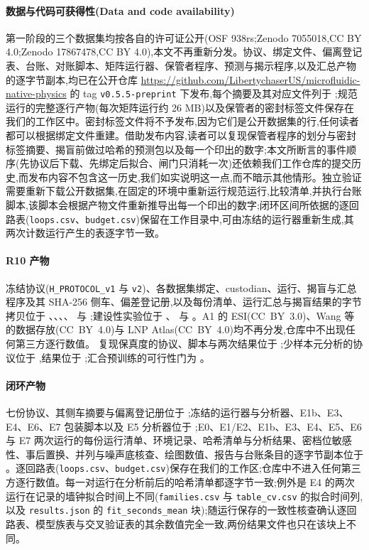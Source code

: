 \documentclass[11pt,a4paper]{ctexart}
\begin{document}
\paragraph{数据与代码可获得性(Data and code availability)} 第一阶段的三个数据集均按各自的许可证公开(OSF 938rs;Zenodo 7055018,CC BY 4.0;Zenodo 17867478,CC BY 4.0),本文不再重新分发。协议、绑定文件、偏离登记表、台账、对账脚本、矩阵运行器、保管者程序、预测与揭示程序,以及汇总产物的逐字节副本,均已在公开仓库 \url{https://github.com/LibertychaserUS/microfluidic-native-physics} 的 tag \texttt{v0.5.5-preprint} 下发布,每个摘要及其对应文件列于 ;规范运行的完整逐行产物(每次矩阵运行约 26 MB)以及保管者的密封标签文件保存在我们的工作区中。密封标签文件将不予发布,因为它们是公开数据集的行,任何读者都可以根据绑定文件重建。借助发布内容,读者可以复现保管者程序的划分与密封标签摘要、揭盲前做过哈希的预测包以及每一个印出的数字;本文所断言的事件顺序(先协议后下载、先绑定后拟合、闸门只消耗一次)还依赖我们工作仓库的提交历史,而发布内容不包含这一历史,我们如实说明这一点,而不暗示其他情形。独立验证需要重新下载公开数据集,在固定的环境中重新运行规范运行,比较清单,并执行台账脚本,该脚本会根据产物文件重新推导出每一个印出的数字;闭环区间所依据的逐回路表(\texttt{loops.csv}、\texttt{budget.csv})保留在工作目录中,可由冻结的运行器重新生成,其两次计数运行产生的表逐字节一致。

\paragraph{R10 产物} 冻结协议(\texttt{H\_PROTOCOL\_v1} 与 \texttt{v2})、各数据集绑定、custodian、运行、揭盲与汇总程序及其 SHA-256 侧车、偏差登记册,以及每份清单、运行汇总与揭盲结果的字节拷贝位于 、、、、 与 ;建设性实验位于 、 与 。A1 的 ESI(CC~BY~3.0)、Wang 等的数据存放(CC~BY~4.0)与 LNP Atlas(CC~BY~4.0)均不再分发,仓库中不出现任何第三方逐行数值。 复现保真度的协议、脚本与两次结果位于 ;少样本元分析的协议位于 ,结果位于 ;汇合预训练的可行性门为 。

\paragraph{闭环产物} 七份协议、其侧车摘要与偏离登记册位于 ;冻结的运行器与分析器、E1b、E3、E4、E6、E7 包装脚本以及 E5 分析器位于 ;E0、E1/E2、E1b、E3、E4、E5、E6 与 E7 两次运行的每份运行清单、环境记录、哈希清单与分析结果、密档位敏感性、事后置换、并列与噪声底核查、绘图数值、报告与台账条目的逐字节副本位于 。逐回路表(\texttt{loops.csv}、\texttt{budget.csv})保存在我们的工作区;仓库中不进入任何第三方逐行数值。每一对运行在分析前后的哈希清单都逐字节一致;例外是 E4 的两次运行在记录的墙钟拟合时间上不同(\texttt{families.csv} 与 \texttt{table\_cv.csv} 的拟合时间列,以及 \texttt{results.json} 的 \texttt{fit\_seconds\_mean} 块);随运行保存的一致性核查确认逐回路表、模型族表与交叉验证表的其余数值完全一致,两份结果文件也只在该块上不同。
\end{document}
